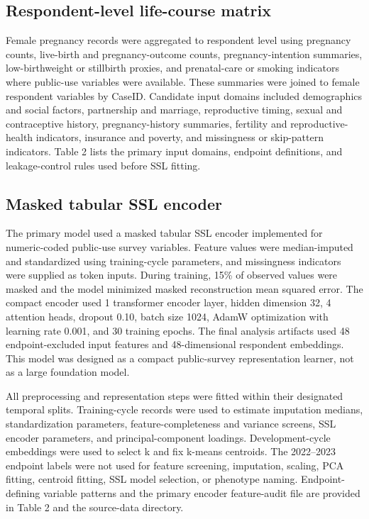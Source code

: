 \documentclass[referee,pdflatex,sn-basic,Numbered]{sn-jnl}
\begin{document}
\subsection{Respondent-level life-course matrix}

Female pregnancy records were aggregated to respondent level using pregnancy counts, live-birth and pregnancy-outcome counts, pregnancy-intention summaries, low-birthweight or stillbirth proxies, and prenatal-care or smoking indicators where public-use variables were available. These summaries were joined to female respondent variables by CaseID. Candidate input domains included demographics and social factors, partnership and marriage, reproductive timing, sexual and contraceptive history, pregnancy-history summaries, fertility and reproductive-health indicators, insurance and poverty, and missingness or skip-pattern indicators. Table 2 lists the primary input domains, endpoint definitions, and leakage-control rules used before SSL fitting.



\subsection{Masked tabular SSL encoder}

The primary model used a masked tabular SSL encoder implemented for numeric-coded public-use survey variables. Feature values were median-imputed and standardized using training-cycle parameters, and missingness indicators were supplied as token inputs. During training, 15\% of observed values were masked and the model minimized masked reconstruction mean squared error. The compact encoder used 1 transformer encoder layer, hidden dimension 32, 4 attention heads, dropout 0.10, batch size 1024, AdamW optimization with learning rate 0.001, and 30 training epochs. The final analysis artifacts used 48 endpoint-excluded input features and 48-dimensional respondent embeddings. This model was designed as a compact public-survey representation learner, not as a large foundation model.

All preprocessing and representation steps were fitted within their designated temporal splits. Training-cycle records were used to estimate imputation medians, standardization parameters, feature-completeness and variance screens, SSL encoder parameters, and principal-component loadings. Development-cycle embeddings were used to select k and fix k-means centroids. The 2022--2023 endpoint labels were not used for feature screening, imputation, scaling, PCA fitting, centroid fitting, SSL model selection, or phenotype naming. Endpoint-defining variable patterns and the primary encoder feature-audit file are provided in Table 2 and the source-data directory.
\end{document}
